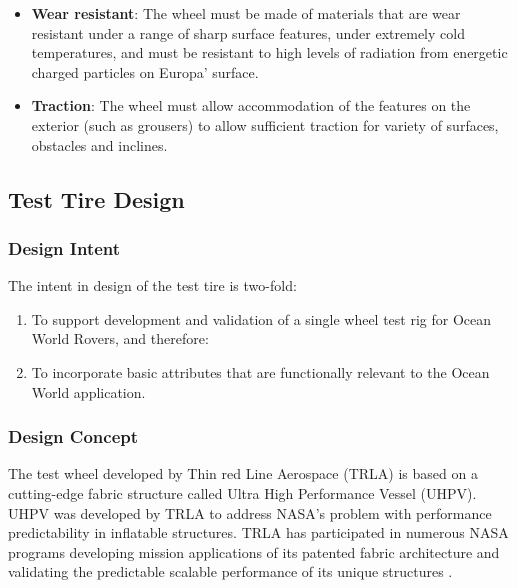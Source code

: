 \documentclass{article}
\begin{document}
\begin{itemize}
    
    \item \textbf{Wear resistant}: The wheel must be made of materials that are wear resistant under a range of sharp surface features, under extremely cold temperatures, and must be resistant to high levels of radiation from energetic charged particles on Europa' surface.
    
    \item \textbf{Traction}: The wheel must allow accommodation of the features on the exterior (such as grousers) to allow sufficient traction  for variety of surfaces, obstacles and inclines.
    
    
    
\end{itemize}

\subsection{Test Tire Design}

\subsubsection{Design Intent}
The intent in design of the test tire is two-fold:
\begin{enumerate}
    \item To support development and validation of a single wheel test rig for Ocean World Rovers, and therefore:
    \item 	To incorporate basic attributes that are functionally relevant to the Ocean World application.
\end{enumerate}

\subsubsection{Design Concept}
The test wheel developed by Thin red Line Aerospace (TRLA) is based on a cutting-edge fabric structure called Ultra High Performance Vessel (UHPV). UHPV was developed by TRLA to address NASA’s problem with performance predictability in inflatable structures. TRLA has participated in numerous NASA programs developing mission applications of its patented fabric architecture and validating the predictable scalable performance of its unique structures \cite{maxim2010a,maxim2010b,maxim2010c}.
\end{document}
